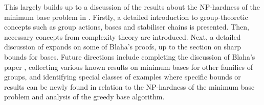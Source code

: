 {    This \thesis{} largely builds up to a discussion of the results about the NP-hardness of the minimum base problem in \cite{blaha1992}. Firstly, a detailed introduction to group-theoretic concepts such as group actions, bases and stabiliser chains is presented. Then, necessary concepts from complexity theory are introduced. Next, a detailed discussion of \cite{blaha1992} expands on some of Blaha's proofs, up to the section on sharp bounds for bases. Future directions include completing the discussion of Blaha's paper \cite{blaha1992}, collecting various known results on minimum bases for other families of groups, and identifying special classes of examples where specific bounds or results can be newly found in relation to the NP-hardness of the minimum base problem and analysis of the greedy base algorithm.

    }


